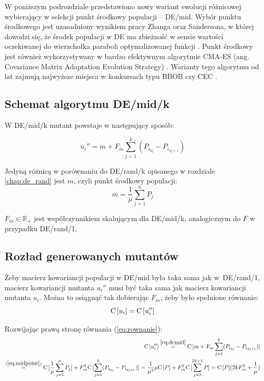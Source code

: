 \documentclass[a4paper,onecolumn,oneside,12pt,wide,floatssmall]{mwrep}
\def\C{{\rm C}\,}
\theoremstyle{definition}
\theoremstyle{plain}%
\theoremstyle{remark}
\begin{document}
W poniższym podrozdziale przedstawiono nowy wariant ewolucji różnicowej wybierający w selekcji punkt środkowy populacji -- DE/mid.
Wybór punktu środkowego jest uzasadniony wynikiem pracy Zhanga oraz Sandersona, w której dowodzi się, że
środek populacji w DE ma zbieżność w sensie wartości oczekiwanej do wierzchołka paraboli optymalizowanej funkcji
\cite{zhang}. Punkt środkowy jest również wykorzystywany w bardzo efektywnym algorytmie CMA-ES
(ang. Covariance Matrix Adaptation Evolution Strategy) \cite{cmaes}.
Warianty tego algorytmu od lat zajmują najwyższe miejsca w konkursach typu BBOB \cite{setup} czy CEC \cite{cec}.

\subsection{Schemat algorytmu DE/mid/k}

W DE/mid/k mutant powstaje w następujący sposób:

\begin{equation} \label{eq:demid}
u_i'' = m + F_m\sum\limits_{j=1}^k (P_{i_{2j}} - P_{i_{2j+1}})
\end{equation}

Jedyną różnicą w porównaniu do DE/rand/k opisanego w rozdziale \ref{chap:de_rand} jest $m$, czyli punkt środkowy populacji:
\begin{equation} \label{eq:midpoint}
m = \frac{1}{\mu}\sum\limits_{j=1}^n P_j
\end{equation}

$F_m\in\mathbb{R_+}$ jest współczynnikiem skalującym dla DE/mid/k, analogicznym do $F$ 
w przypadku DE/rand/1. 

\subsection{Rozład generowanych mutantów}

Żeby macierz kowariancji populacji w DE/mid była taka sama jak w~DE/rand/1, 
macierz kowariancji mutanta $u_i''$ musi być taka sama jak macierz kowariancji mutanta $u_i$.
Można to osiągnąć tak dobierając $F_m$, żeby było spełnione równanie:
\begin{equation} \label{eq:rownanie}
\C[u_i] = \C[u_i'']
\end{equation}

Rozwijając prawą stronę równania (\ref{eq:rownanie}):
\begin{align*}
\C[u_i''] \overset{\eqref{eq:demid}}{=} \C[m + F_m\sum\limits_{j=1}^k (P_{i_{2j}} - P_{i_{2j+1}})] \\
\overset{(\ref{eq:midpoint})}{=} \C[\frac{1}{\mu}\sum\limits_{j=1}^\mu P_j] + F_m^2\C[\sum\limits_{j=1}^k (P_{i_{2j}} - P_{i_{2j+1}})] 
= \frac{1}{\mu^2}\mu\C[P] + F_m^2\C[\sum\limits_{j=2}^{2k+1} P] = \C[P](2kF_m^2 + \frac{1}{\mu})
\end{align*}
\end{document}
